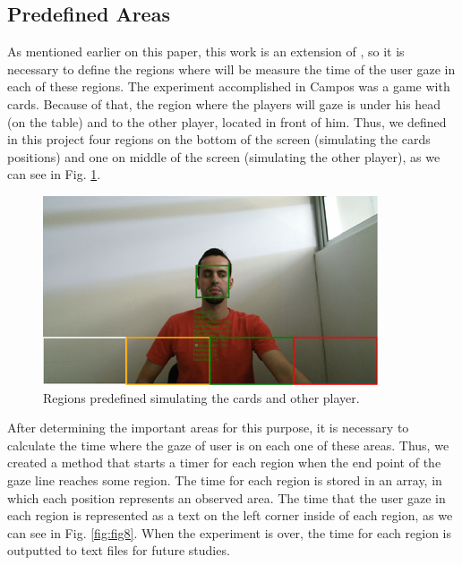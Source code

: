 \documentclass[10pt, conference]{IEEEtran}
\begin{document}
\subsection{Predefined Areas}

	As mentioned earlier on this paper, this work is an extension of \cite{6}, so it is necessary to define the regions where will be measure the time of the user gaze in each of these regions. 
	The experiment accomplished in Campos was a game with cards. 
	Because of that, the region where the players will gaze is under his head (on the table) and to the other player, located in front of him. 
	Thus, we defined in this project four regions on the bottom of the screen (simulating the cards positions) and one on middle of the screen (simulating the other player), as we can see in Fig. \ref{fig:fig7}.

  \begin{figure}[t]
      \centering
      \includegraphics{figures/pic7.png}
      \caption{Regions predefined simulating the cards and other player.}
      \label{fig:fig7}
  \end{figure}

	After determining the important areas for this purpose, it is necessary to calculate the time where the gaze of user is on each one of these areas. 
	Thus, we created a method that starts a timer for each region when the end point of the gaze line reaches some region. 
	The time for each region is stored in an array, in which each position represents an observed area. 
	The time that the user gaze in each region is represented as a text on the left corner inside of each region, as we can see in Fig. \ref{fig:fig8}. 
	When the experiment is over, the time for each region is outputted to text files for future studies.
\end{document}
